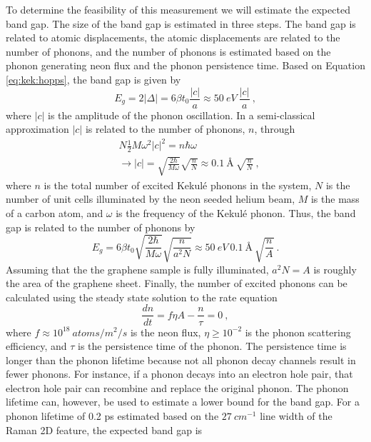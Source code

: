 To determine the feasibility of this measurement we will estimate the expected band gap.
The size of the band gap is estimated in three steps.
The band gap is related to atomic displacements, the atomic displacements are related to the number of phonons, and the number of phonons is estimated based on the phonon generating neon flux and the phonon persistence time.
Based on Equation \ref{eq:kek:hopps}, the band gap is given by
\begin{equation*}
	E_g=2|\Delta|=6 \beta t_0 \frac{|c|}{a} \approx 50 \ eV \ \frac{|c|}{a} \ ,
\end{equation*}
where $|c|$ is the amplitude of the phonon oscillation.
In a semi-classical approximation $|c|$ is related to the number of phonons, $n$, through
\begin{align*}
	&N \frac{1}{2} M \omega^2 |c|^2=n \hbar \omega \\
	&\rightarrow |c|=\sqrt{\frac{2 \hbar}{M \omega}} \sqrt{\frac{n}{N}} \approx 0.1 \ \text{\AA} \ \sqrt{\frac{n}{N}}	\ ,
\end{align*}
where $n$ is the total number of excited Kekul\'e phonons in the system, $N$ is the number of unit cells illuminated by the neon seeded helium beam, $M$ is the mass of a carbon atom, and $\omega$ is the frequency of the Kekul\'e phonon.
Thus, the band gap is related to the number of phonons by
\begin{equation*}
	E_g=6 \beta t_0 \sqrt{\frac{2 \hbar}{M \omega}}\sqrt{\frac{n}{a^2N}} 
	\approx 50 \ eV \ 0.1 \ \text{\AA} \ \sqrt{\frac{n}{A}} \ .
\end{equation*}
Assuming that the the graphene sample is fully illuminated, $a^2 N=A$ is roughly the area of the graphene sheet.
Finally, the number of excited phonons can be calculated using the steady state solution to the rate equation
\begin{equation*}
	\frac{dn}{dt}=f \eta A-\frac{n}{\tau}=0 \ ,
\end{equation*}
where $f \approx 10^{18} \ atoms/m^2/s$ is the neon flux, $\eta \geq 10^{-2}$ is the phonon scattering efficiency, and $\tau$ is the persistence time of the phonon.
The persistence time is longer than the phonon lifetime because not all phonon decay channels result in fewer phonons.
For instance, if a phonon decays into an electron hole pair, that electron hole pair can recombine and replace the original phonon.
The phonon lifetime can, however, be used to estimate a lower bound for the band gap.
For a phonon lifetime of  0.2 ps estimated based on the $27 \ cm^{-1}$ line width of the Raman 2D feature, the expected band gap is
